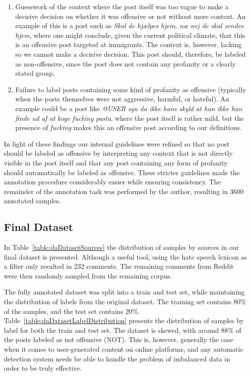 \documentclass{article}
\begin{document}
\begin{enumerate}
    \item Guesswork of the context where the post itself was too vague to make a decisive decision on whether it was offensive or not without more context. An example of this is a post such as \textit{Skal de hjælpes hjem, næ nej de skal sendes hjem}, where one might conclude, given the current political climate, that this is an offensive post targeted at immigrants. The context is, however, lacking so we cannot make a decisive decision. This post should, therefore, be labeled as non-offensive, since the post does not contain any profanity or a clearly stated group.
    \item Failure to label posts containing some kind of profanity as offensive (typically when the posts themselves were not aggressive, harmful, or hateful). An example could be a post like \textit{@USER sgu da ikke hans skyld at hun ikke han finde ud af at koge fucking pasta}, where the post itself is rather mild, but the presence of \textit{fucking} makes this an offensive post according to our definitions.
\end{enumerate}

In light of these findings our internal guidelines were refined so that no post should be labeled as offensive by interpreting any context that is not directly visible in the post itself  and that any post containing any form of profanity should automatically be labeled as offensive. These stricter guidelines made the annotation procedure considerably easier while ensuring consistency. The remainder of the annotation task was performed by the author, resulting in 3600 annotated samples.


\subsection{Final Dataset}\label{sec:resultingDataset}
In Table~\ref{table:daDatasetSources} the distribution of samples by sources in our final dataset is presented. Although a useful tool, using the hate speech lexicon as a filter only resulted in 232 comments. The remaining comments from Reddit were then randomly sampled from the remaining corpus.

The fully annotated dataset was split into a train and test set, while maintaining the distribution of labels from the original dataset. The training set contains 80\% of the samples, and the test set contains 20\%. Table~\ref{table:daDatasetLabelDistribution} presents the distribution of samples by label for both the train and test set. The dataset is skewed, with around $88$\% of the posts labeled as not offensive (NOT). This is, however, generally the case when it comes to user-generated content on online platforms, and any automatic detection system needs be able to handle the problem of imbalanced data in order to be truly effective.
\end{document}

